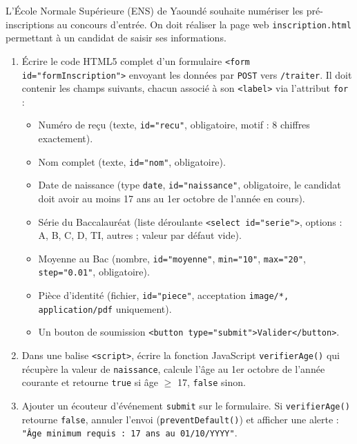 \documentclass[11pt]{article}
\begin{document}
\begin{exercice}
L'École Normale Supérieure (ENS) de Yaoundé souhaite numériser les pré-inscriptions au concours d'entrée. On doit réaliser la page web \texttt{inscription.html} permettant à un candidat de saisir ses informations.
\begin{enumerate}
    \item Écrire le code HTML5 complet d'un formulaire \texttt{<form id="formInscription">} envoyant les données par \texttt{POST} vers \texttt{/traiter}. Il doit contenir les champs suivants, chacun associé à son \texttt{<label>} via l'attribut \texttt{for} :
    \begin{itemize}
        \item Numéro de reçu (texte, \texttt{id="recu"}, obligatoire, motif : 8 chiffres exactement).
        \item Nom complet (texte, \texttt{id="nom"}, obligatoire).
        \item Date de naissance (type \texttt{date}, \texttt{id="naissance"}, obligatoire, le candidat doit avoir au moins 17 ans au 1er octobre de l'année en cours).
        \item Série du Baccalauréat (liste déroulante \texttt{<select id="serie">}, options : A, B, C, D, TI, autres ; valeur par défaut vide).
        \item Moyenne au Bac (nombre, \texttt{id="moyenne"}, \texttt{min="10"}, \texttt{max="20"}, \texttt{step="0.01"}, obligatoire).
        \item Pièce d'identité (fichier, \texttt{id="piece"}, acceptation \texttt{image/*, application/pdf} uniquement).
        \item Un bouton de soumission \texttt{<button type="submit">Valider</button>}.
    \end{itemize}
    \item Dans une balise \texttt{<script>}, écrire la fonction JavaScript \texttt{verifierAge()} qui récupère la valeur de \texttt{naissance}, calcule l'âge au 1er octobre de l'année courante et retourne \texttt{true} si âge $\ge$ 17, \texttt{false} sinon.
    \item Ajouter un écouteur d'événement \texttt{submit} sur le formulaire. Si \texttt{verifierAge()} retourne \texttt{false}, annuler l'envoi (\texttt{preventDefault()}) et afficher une alerte : \texttt{"Âge minimum requis : 17 ans au 01/10/YYYY"}.
\end{enumerate}
\end{exercice}
\end{document}
